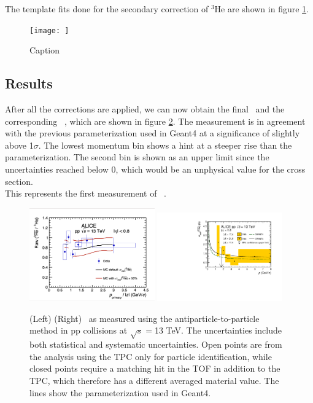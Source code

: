 The template fits done for the secondary correction of $^3\mathrm{He}$ are shown in figure \ref{fig:Template_fits_he}.  

\begin{figure}
    \centering
    \texttt{[image: ]}
    \caption{Caption}
    \label{fig:Template_fits_he}
\end{figure}

\subsection{Results}
After all the corrections are applied, we can now obtain the final \ratio\ and the corresponding \sigmainel\ , which are shown in figure \ref{fig:Ahe_sigma_inel_pp}. The measurement is in agreement with the previous parameterization used in Geant4 at a significance of slightly above 1$\sigma$. The lowest momentum bin shows a hint at a steeper rise than the parameterization. The second bin is shown as an upper limit since the uncertainties reached below 0, which would be an unphysical value for the cross section. \\

This represents the first measurement of \sigmainel\ .
\begin{figure}
    \centering
    \includegraphics[width=0.48\textwidth]{figures/he3bar_he3_ratio.png}
    \includegraphics[width=0.48\textwidth]{figures/Antihelium_inelastic_cross_section.pdf}
    \caption{(Left) (Right) \sigmainel\ as measured using the antiparticle-to-particle method in pp collisions at $\sqrt{s}=$13 TeV. The uncertainties include both statistical and systematic uncertainties. Open points are from the analysis using the TPC only for particle identification, while closed points require a matching hit in the TOF in addition to the TPC, which therefore has a different averaged material value. The lines show the parameterization used in Geant4.}
    \label{fig:Ahe_sigma_inel_pp}
\end{figure}


